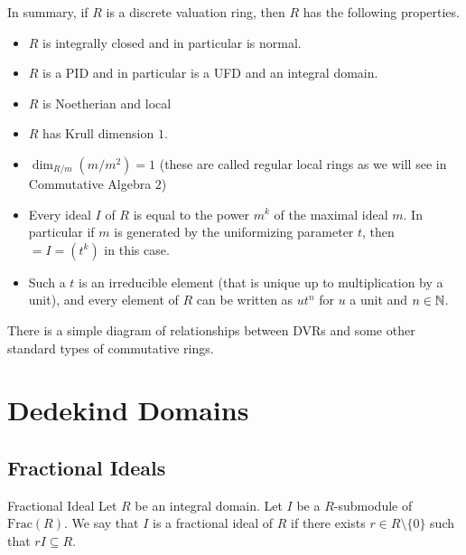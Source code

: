 \documentclass[a4paper]{article}
\begin{document}
In summary, if $R$ is a discrete valuation ring, then $R$ has the following properties. 
\begin{itemize}
\item $R$ is integrally closed and in particular is normal. 
\item $R$ is a PID and in particular is a UFD and an integral domain. 
\item $R$ is Noetherian and local
\item $R$ has Krull dimension $1$. 
\item $\dim_{R/m}(m/m^2)=1$ (these are called regular local rings as we will see in Commutative Algebra $2$)
\item Every ideal $I$ of $R$ is equal to the power $m^k$ of the maximal ideal $m$. In particular if $m$ is generated by the uniformizing parameter $t$, then $=I=(t^k)$ in this case. 
\item Such a $t$ is an irreducible element (that is unique up to multiplication by a unit), and every element of $R$ can be written as $ut^n$ for $u$ a unit and $n\in\mathbb{N}$. 
\end{itemize}

There is a simple diagram of relationships between DVRs and some other standard types of commutative rings. 


\pagebreak

\section{Dedekind Domains}
\subsection{Fractional Ideals}
\begin{defn}{Fractional Ideal}{} Let $R$ be an integral domain. Let $I$ be a $R$-submodule of $\text{Frac}(R)$. We say that $I$ is a fractional ideal of $R$ if there exists $r\in R\setminus\{0\}$ such that $rI\subseteq R$. 
\end{defn}
\end{document}
